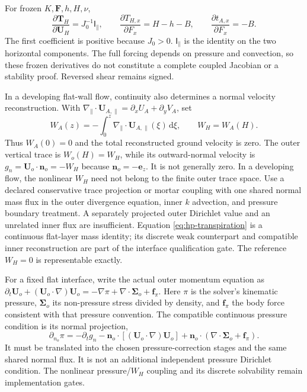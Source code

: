 \documentclass[11pt,a4paper]{article}
\numberwithin{equation}{section}
\newcommand{\dd}{\mathrm{d}}
\newcommand{\I}{\mathsf{I}}
\begin{document}
For frozen $K,\bm F,h,H,\nu$,
\begin{equation}
 \frac{\partial\bm T_H}{\partial\bm U_H}=J_0^{-1}\I_\parallel,
 \qquad
 \frac{\partial T_{H,x}}{\partial F_x}=H-h-B,
 \qquad
 \frac{\partial t_{A,x}}{\partial F_x}=-B.
 \label{eq:hp-response}
\end{equation}
The first coefficient is positive because $J_0>0$.
$\I_\parallel$ is the identity on the two horizontal components.
The full forcing depends on pressure and convection, so these frozen
derivatives do not constitute a complete coupled Jacobian or a stability
proof. Reversed shear remains signed.

In a developing flat-wall flow, continuity also determines a normal
velocity reconstruction. With
$\nabla_\parallel\cdot\bm U_{A,\parallel}
=\partial_xU_A+\partial_yV_A$, set
\begin{equation}
 W_A(z)=-\int_0^z
       \nabla_\parallel\cdot\bm U_{A,\parallel}(\xi)\,\dd\xi,
 \qquad W_H=W_A(H).
 \label{eq:hp-transpiration}
\end{equation}
Thus $W_A(0)=0$ and the total reconstructed ground velocity is zero.
The outer vertical trace is $W_o(H)=W_H$, while its outward-normal
velocity is $g_n=\bm U_o\cdot\bm n_o=-W_H$ because
$\bm n_o=-\bm e_z$. It is not generally zero. In a developing flow,
the nonlinear $W_H$ need not belong to the finite outer trace space.
Use a declared conservative trace projection or mortar coupling with
one shared normal mass flux in the outer divergence equation, inner
$k$ advection, and pressure boundary treatment. A separately projected
outer Dirichlet value and an unrelated inner flux are insufficient.
Equation \eqref{eq:hp-transpiration} is a continuous flat-layer mass
identity; its discrete weak counterpart and compatible inner
reconstruction are part of the interface qualification gate. The
reference $W_H=0$ is representable exactly.

For a fixed flat interface, write the actual outer momentum equation
as $\partial_t\bm U_o+(\bm U_o\cdot\nabla)\bm U_o
=-\nabla\pi+\nabla\cdot\boldsymbol\Sigma_o+\bm f_\pi$.
Here $\pi$ is the solver's kinematic pressure, $\boldsymbol\Sigma_o$
its non-pressure stress divided by density, and $\bm f_\pi$ the
body force consistent with that pressure convention. The compatible
continuous pressure condition is its normal projection,
\begin{equation}
 \partial_{n_o}\pi=-\partial_t g_n
 -\bm n_o\cdot[(\bm U_o\cdot\nabla)\bm U_o]
 +\bm n_o\cdot(\nabla\cdot\boldsymbol\Sigma_o+\bm f_\pi).
 \label{eq:hp-pressure-continuous}
\end{equation}
It must be translated into the chosen pressure-correction stages and
the same shared normal flux. It is not an additional independent
pressure Dirichlet condition. The nonlinear pressure/$W_H$ coupling
and its discrete solvability remain implementation gates.
\end{document}
